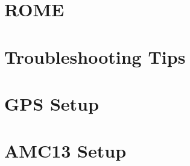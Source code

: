 

\section{ROME}



\section{Troubleshooting Tips}



\appendix

\section{GPS Setup}



\section{AMC13 Setup}




